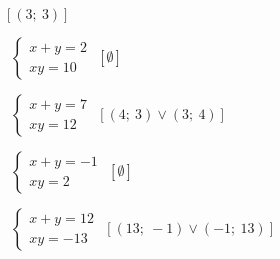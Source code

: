 \begin{esercizio}[\Ast]
\begin{multicols}{2}
\begin{enumeratea}
  \hfill$\left[(3;~3)\right]$
 \item~$\left\{\begin{array}{l}x+y=2\\{xy}=10 \end{array}\right.$
  \hfill$\left[\emptyset\right]$
 \item~$\left\{\begin{array}{l}x+y=7\\{xy}=12 \end{array}\right.$
  \hfill$\left[(4;~3)\vee(3;~4)\right]$
 \item~$\left\{\begin{array}{l}x+y=-1\\{xy}=2 \end{array}\right.$
  \hfill$\left[\emptyset\right]$
 \item~$\left\{\begin{array}{l}x+y=12\\{xy}=-13 \end{array}\right.$
  \hfill$\left[(13;~-1)\vee(-1;~13)\right]$
 \end{enumeratea}
 \end{multicols}
\end{esercizio}

